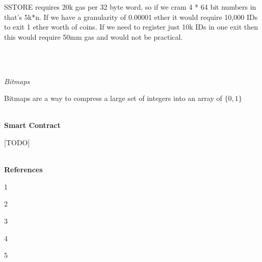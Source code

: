 \documentclass[11pt]{article}
\begin{document}
SSTORE requires 20k gas per 32 byte word, so if we cram 4 * 64 bit numbers in that’s 5k*n. If we have a granularity of 0.00001 ether it would require 10,000 IDs to exit 1 ether worth of coins. If we need to register just 10k IDs in one exit then this would require 50mm gas and would not be practical. 

\\
\\
\centerline{\textit{Bitmaps}}

Bitmaps are a way to compress a large set of integers into an array of $\{0,1\}$ 
\\
\\

\centerline{\textbf{Smart Contract}}

[TODO]
\\
\\
\centerline{\textbf{References}}

1 \url{}

2 \url{}

3 \url{}

4 \url{}

5 \url{}
\end{document}
